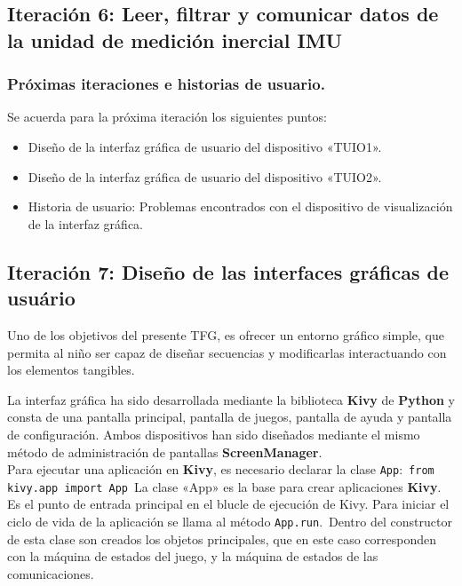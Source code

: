 \subsection{Iteración 6: Leer, filtrar y comunicar datos de la unidad de medición inercial IMU}



\subsubsection{Próximas iteraciones e historias de usuario.}
Se acuerda para la próxima iteración los siguientes puntos:
\begin{itemize}
\item Diseño de la interfaz gráfica de usuario del dispositivo «TUIO1».
\item Diseño de la interfaz gráfica de usuario del dispositivo «TUIO2».
\item Historia de usuario: Problemas encontrados con el dispositivo de visualización de la interfaz gráfica.
\end{itemize}



\subsection{Iteración 7: Diseño de las interfaces gráficas de usuário}

Uno de los objetivos del presente TFG, es ofrecer un entorno gráfico simple, que permita al niño ser capaz de diseñar secuencias y modificarlas interactuando con los elementos tangibles.

La interfaz gráfica ha sido desarrollada mediante la biblioteca \textbf{Kivy} de \textbf{Python} y consta de una pantalla principal, pantalla de juegos, pantalla de ayuda y pantalla de configuración. Ambos dispositivos han sido diseñados mediante el mismo método de administración de pantallas \textbf{ScreenManager}.\\
Para ejecutar una aplicación en \textbf{Kivy}, es necesario declarar la clase \texttt{App}:\
\texttt{from kivy.app import App}\
La clase «App» es la base para crear aplicaciones \textbf{Kivy}. Es el punto de entrada principal en el blucle de ejecución de Kivy. Para iniciar el ciclo de vida de la aplicación se llama al método \texttt{App.run}.\
Dentro del constructor de esta clase son creados los objetos principales, que en este caso corresponden con la máquina de estados del juego, y la máquina de estados de las comunicaciones.

